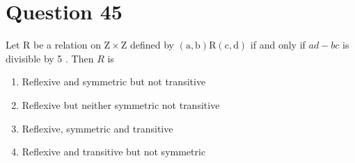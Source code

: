 \documentclass{article}
\begin{document}
\section*{Question 45}
Let \(\mathrm{R}\) be a relation on \(\mathrm{Z} \times \mathrm{Z}\) defined by \((\mathrm{a}, \mathrm{b}) \mathrm{R}(\mathrm{c}, \mathrm{d})\) if and only if \(a d-b c\) is divisible by 5 . Then \(R\) is
\begin{enumerate}[label=(\alph*)]
\item Reflexive and symmetric but not transitive
\item Reflexive but neither symmetric not transitive
\item Reflexive, symmetric and transitive
\item Reflexive and transitive but not symmetric
\end{enumerate}
\newpage
\end{document}
